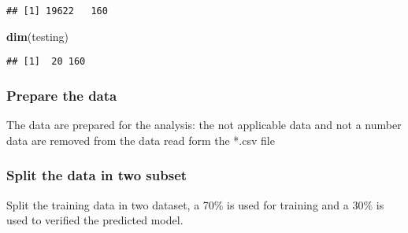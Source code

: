 \documentclass[]{article}
\newenvironment{Shaded}{\begin{snugshade}}{\end{snugshade}}
\newcommand{\KeywordTok}[1]{\textcolor[rgb]{0.13,0.29,0.53}{\textbf{#1}}}
\newcommand{\DecValTok}[1]{\textcolor[rgb]{0.00,0.00,0.81}{#1}}
\newcommand{\StringTok}[1]{\textcolor[rgb]{0.31,0.60,0.02}{#1}}
\newcommand{\CommentTok}[1]{\textcolor[rgb]{0.56,0.35,0.01}{\textit{#1}}}
\newcommand{\OperatorTok}[1]{\textcolor[rgb]{0.81,0.36,0.00}{\textbf{#1}}}
\newcommand{\NormalTok}[1]{#1}
\begin{document}
\begin{verbatim}
## [1] 19622   160
\end{verbatim}

\begin{Shaded}
\begin{Highlighting}[]
\KeywordTok{dim}\NormalTok{(testing)}
\end{Highlighting}
\end{Shaded}

\begin{verbatim}
## [1]  20 160
\end{verbatim}

\subsubsection{Prepare the data}\label{prepare-the-data}

The data are prepared for the analysis: the not applicable data and not
a number data are removed from the data read form the *.csv file

\begin{Shaded}
\end{Shaded}

\subsubsection{Split the data in two
subset}\label{split-the-data-in-two-subset}

Split the training data in two dataset, a 70\% is used for training and
a 30\% is used to verified the predicted model.
\end{document}

